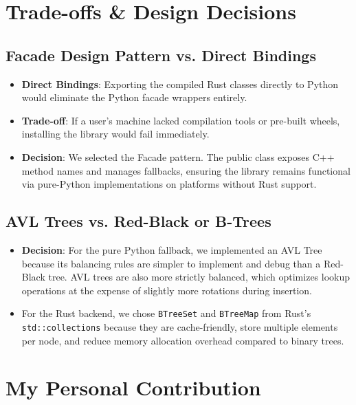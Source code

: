 \documentclass[11pt,a4paper]{article}
\begin{document}
\section{Trade-offs \& Design Decisions}

\subsection{Facade Design Pattern vs. Direct Bindings}
\begin{itemize}
    \item \textbf{Direct Bindings}: Exporting the compiled Rust classes directly to Python would eliminate the Python facade wrappers entirely.
    \item \textbf{Trade-off}: If a user's machine lacked compilation tools or pre-built wheels, installing the library would fail immediately.
    \item \textbf{Decision}: We selected the Facade pattern. The public class exposes C++ method names and manages fallbacks, ensuring the library remains functional via pure-Python implementations on platforms without Rust support.
\end{itemize}

\subsection{AVL Trees vs. Red-Black or B-Trees}
\begin{itemize}
    \item \textbf{Decision}: For the pure Python fallback, we implemented an AVL Tree because its balancing rules are simpler to implement and debug than a Red-Black tree. AVL trees are also more strictly balanced, which optimizes lookup operations at the expense of slightly more rotations during insertion.
    \item For the Rust backend, we chose \texttt{BTreeSet} and \texttt{BTreeMap} from Rust's \texttt{std::collections} because they are cache-friendly, store multiple elements per node, and reduce memory allocation overhead compared to binary trees.
\end{itemize}

\newpage

\section{My Personal Contribution}
\end{document}
